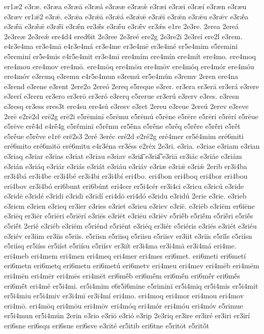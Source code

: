 {er1æ2
e3ræ.
e3ræa
e3ræā
e3ræá
e3rææ
e3ræǽ
e3ræi
e3ræī
e3ræí
e3ræn
e3ræu
e3ræv
er1ǣ2
e3rǣ.
e3rǣa
e3rǣā
e3rǣá
e3rǣǣ
e3rǣī
e3rǣn
e3rǣu
e3rǣv
e3rǣ́a
e3rǣ́ā
e3rǣ́ǣ
e3rǣ́ī
e3rǣ́n
er3ǣ́s
e3rǣ́u
e3rǣ́v
er3ǽs
e1re
2e3re.
2erea
2ereá
2e3reæ
2e3reǽ
ere4d4
ered6it
2e3ree
2e3reé
ere2g
2e3re2i
2e3reí
ere2l
e3rem.
e4r3e4ma
er3e4mā
e4r3e4má
er3e4me
er3e4mē
er3e4mé
er5e4mim
e5remini
e5reminí
er5e4mis
e4r5e4mit
er3e4mī
ere4mím
ere4mín
ere4mít
ere4mo.
ere4moq
ere4mou
ere4mov
ere4mō.
ere4mōq
ere4mōu
ere4mōv
ere4móq
ere4mór
ere4móu
ere4móv
e3remq
e3remu
e4r5e4mun
e3remú
er5e4mún
e3remv
2eren
ere4na
e3rend
e3rene
e3rent
2ere2o
2ereó
2ereq
e5reque
e3rer.
er3era
er3erā
er3erá
e3rere
e3rerí
e3rern
er3ero
er3erō
er3eró
e3rerq
e5rerue
er3erú
e3rerv
e3res.
e3resn
e3resq
er3ess
eres3t
ere4su
ere4sú
e3resv
e3ret
2ereu
e3reue
2ereú
2erev
e3reve
2erē
e2rē2d
erē2g
erē2i
e5rēminī
e5rēmu
e5rēmú
e5rēne
e5rēre
e5rēri
e5rērí
e5rēue
e5rēve
erḗ4d
e4rḗ4g
e5rḗminī
e5rḗmu
er5ḗna
e5rḗne
e5rḗq
e5rḗre
e5rḗri
e5rḗt
e5rḗue
e5rḗve
e1rĕ
erĕ2s3
2eré
3eréc
eré2d
e2ré2g
eré4mer
er5é4mim
eré6miti
eré6mito
eré6mitō
eré6mitu
e4r3éna
er3éss
e2réx
2e3ri.
e3ria.
e3riae
e3riam
e3rian
e3riaq
e3riar
e3rias
e3riat
e3riau
e3riav
e3ria͞
e3ria͡
e3riā
er3iác
e3riáe
e3riám
e3rián
e3riáq
e3riár
e3riás
e3riát
e3riáu
e3riáv
e3riæ
e3riǣ
e3riǽ
2erib
er3i4ba
er3i4bá
er3i4be
er3i4bé
er3i4bi
er3i4bí
eri4bo.
eri4bon
eri4boq
eri4bor
eri4bou
eri4bov
er3i4bó
eri6bunt
eri6búnt
eri4cer
er5i4cér
er3i4ci
e3ricu
e3ricú
e3ride
e3ridē
e3ridé
e3ridi
e3ridī
e3ridí
eri4dō
eri4dó
e3ridu
e3ridú
2erie
e3rie.
e3rieb
e3riem
e3rien
e3rieq
er3ier
e3ries
e3riet
e3rieu
e3riev
e3riē.
e3riēb
e3riēm
er6iēne
e3riēq
er3iēr
e5riēri
e5riērí
e3riēs
e3riēt
e3riēu
e3riēv
e5riḗb
e5riḗm
e5riḗri
e5riḗs
e5riḗt
2erié
e3riéb
e3riém
e5riénd
e5riént
e3riéq
er3iér
e5riéris
e3riés
e3riét
e3riéu
e3riév
er3iim
er3iis
e5riis.
e5riisn
e5riisq
e5riisu
e5riisv
er3iit
e3riīs
e5riī́s
e5riísn
e5riísq
er5iíss
er5iíst
e5riísu
e5riísv
er3iít
er3i4ma
er3i4mā
er3i4má
eri4me.
eri4meb
eri4mem
eri4men
eri4meq
eri4mer
eri4mes
eri6met.
eri6meti
eri6metí
eri6metn
eri6metq
eri6metu
eri6metú
eri6metv
eri4meu
eri4mev
eri4mēb
eri4mēm
eri4mēn
eri4mēr
eri4mēs
eri4mēt
eri6mḗb
eri6mḗm
eri6mḗn
eri6mḗr
eri6mḗs
eri6mḗt
eri4mé
er5i4mi.
er5i4mim
e6r5i6mine
e5riminī
er5i4miq
er5i4mis
er5i4mit
er5i4miu
er5i4miv
er3i4mī
er3i4mí
eri4mo.
eri4moq
eri4mor
eri4mou
eri4mov
eri4mō.
eri4mōq
eri4mōu
eri4mōv
eri4móq
eri4mór
eri4móu
eri4móv
e5rimue
er5i4mun
er5i4mún
2erin
e3rio
e3riō
e3rió
e3rip
2e3riq
er3ire
er3iré
er3iri
er3irí
eri6sne
eri6squ
eri6sue
eri6sve
e3rité
er5itib
eri6tne
e5ritōt
e5ritṓt
}

